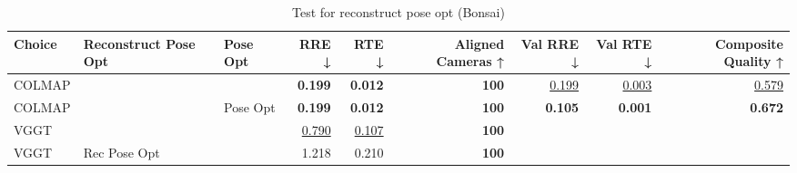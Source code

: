 \begin{table}[H]
\caption{Test for reconstruct pose opt (Bonsai)}
\label{tab:99_reconstruct_pose_opt_bonsai}
\begin{tabular}{lllrrrrrr}
\toprule
Choice & Reconstruct Pose Opt & Pose Opt & RRE ↓ & RTE ↓ & Aligned Cameras ↑ & Val RRE ↓ & Val RTE ↓ & Composite Quality ↑ \\
\midrule
COLMAP &  &  & \textbf{0.199} & \textbf{0.012} & \textbf{100} & \underline{0.199} & \underline{0.003} & \underline{0.579} \\
COLMAP &  & Pose Opt & \textbf{0.199} & \textbf{0.012} & \textbf{100} & \textbf{0.105} & \textbf{0.001} & \textbf{0.672} \\
VGGT &  &  & \underline{0.790} & \underline{0.107} & \textbf{100} &  &  &  \\
VGGT & Rec Pose Opt &  & 1.218 & 0.210 & \textbf{100} &  &  &  \\
\bottomrule
\end{tabular}
\end{table}
